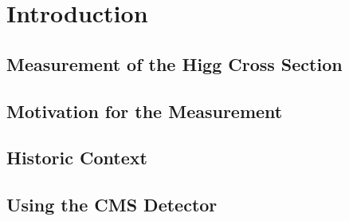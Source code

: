 \chapter{Introduction}


\section{Measurement of the Higg Cross Section}


\section{Motivation for the Measurement}


\section{Historic Context}

\cite{obs-18}

\section{Using the CMS Detector}

